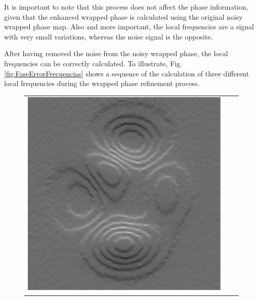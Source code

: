 It is important to note that this process does not affect the phase information,
given that the enhanced wrapped phase is calculated using the original noisy
wrapped phase map. Also and more important, the local frequencies are a signal
with very small variations,  whereas the noise signal is the opposite.

After having removed the noise from the noisy wrapped phase, the local
frequencies can be correctly calculated. To illustrate, Fig.
\ref{fig:FaseErrorFrecuencias} shows a sequence of the calculation of three
different local frequencies during the wrapped phase refinement process.

\begin{figure}[Ht]
  \begin{center}
    \begin{tabular}{c c c}
      \includegraphics[scale=0.45]{Chpt4_figures/Fig_frecuencias1.eps}&

\end{tabular}
\end{center}
\end{figure}
